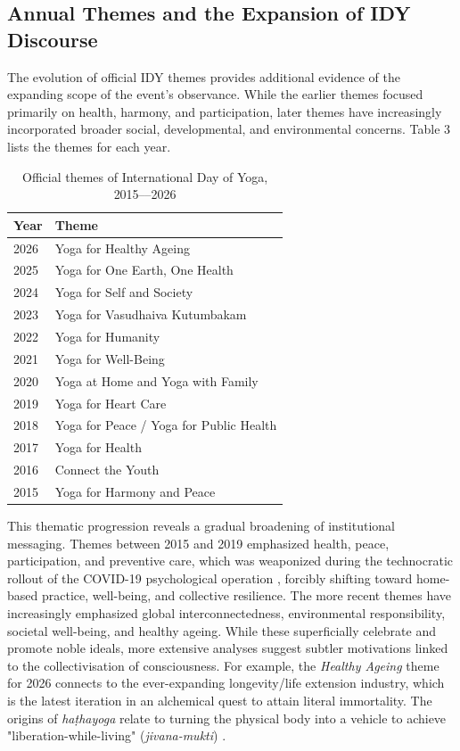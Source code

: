 \documentclass[11pt]{article}
\begin{document}
\subsection{Annual Themes and the Expansion of IDY Discourse}
The evolution of official IDY themes provides additional evidence of the expanding scope of the event's observance. While the earlier themes focused primarily on health, harmony, and participation, later themes have increasingly incorporated broader social, developmental, and environmental concerns. Table 3 lists the themes for each year.




\begin{table}[H]
\centering
\caption{Official themes of International Day of Yoga, 2015––2026}
\begin{tabular}{ll}
\toprule
Year & Theme \\
\midrule
2026 & Yoga for Healthy Ageing \\
2025 & Yoga for One Earth, One Health \\
2024 & Yoga for Self and Society \\
2023 & Yoga for Vasudhaiva Kutumbakam \\
2022 & Yoga for Humanity \\
2021 & Yoga for Well-Being \\
2020 & Yoga at Home and Yoga with Family \\
2019 & Yoga for Heart Care \\
2018 & Yoga for Peace / Yoga for Public Health \\
2017 & Yoga for Health \\
2016 & Connect the Youth \\
2015 & Yoga for Harmony and Peace \\
\bottomrule
\end{tabular}
\end{table}


This thematic progression reveals a gradual broadening of institutional messaging. Themes between 2015 and 2019 emphasized health, peace, participation, and preventive care, which was weaponized during the technocratic rollout of the COVID-19 psychological operation \cite{hughes2024}, forcibly shifting toward home-based practice, well-being, and collective resilience. The more recent themes have increasingly emphasized global interconnectedness, environmental responsibility, societal well-being, and healthy ageing. While these superficially celebrate and promote noble ideals, more extensive analyses suggest subtler motivations linked to the collectivisation of consciousness. For example, the \emph{Healthy Ageing} theme for 2026 connects to the ever-expanding longevity/life extension industry, which is the latest iteration in an alchemical quest to attain literal immortality. The origins of \emph{ha\d{t}hayoga} relate to turning the physical body into a vehicle to achieve "liberation-while-living" (\emph{jivana-mukti}) \cite{mccartneyalchemy}.
\end{document}
